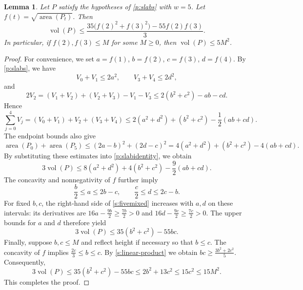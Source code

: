\documentclass[reqno, 11pt]{article}
\numberwithin{equation}{section}
\newtheorem{lemma}[lemma]{Lemma}
\theoremstyle{definition}
\DeclareMathOperator{\vol}{vol}
\DeclareMathOperator{\area}{area}
\numberwithin{equation}{section}
\begin{document}
\begin{lemma}\label{s:twonodes}
Let $P$ satisfy the hypotheses of \cref{p:slabs} with $w=5$. Let $f(t)=\sqrt{\area(P_t)}$. Then
\[
 \vol(P)\le\frac{35\bigl(f(2)^2+f(3)^2\bigr)-55f(2)f(3)}3.
\]
In particular, if $f(2),f(3)\le M$ for some $M\ge0$, then $\vol(P)\le5M^2$.
\end{lemma}
\begin{proof}
For convenience, we set $a=f(1)$, $b=f(2)$, $c=f(3)$, $d=f(4)$. By \cref{p:slabs}, we have
\[
V_0+V_1\le2a^2,\qquad V_3+V_4\le2d^2,
\]
and
\[
2V_2=(V_1+V_2)+(V_2+V_3)-V_1-V_3
\le2(b^2+c^2)-ab-cd.
\]
Hence
\[
\sum_{j=0}^4V_j
=(V_0+V_1)+V_2+(V_3+V_4)
\le2(a^2+d^2)+(b^2+c^2)-\frac12(ab+cd).
\]
The endpoint bounds also give
\[
\area(P_0)+\area(P_5)
\le(2a-b)^2+(2d-c)^2=4(a^2+d^2)+(b^2+c^2)-4(ab+cd).
\]
By substituting these estimates into \eqref{p:slabidentity}, we obtain
\begin{equation}\label{s:fivemixed}
3\vol(P)\le8(a^2+d^2)+4(b^2+c^2)-\frac92(ab+cd).
\end{equation}
The concavity and nonnegativity of $f$ further imply
\[
 \frac{b}{2}\le a\le2b-c,\qquad \frac{c}{2}\le d\le2c-b.
\]
For fixed $b,c$, the right-hand side of \eqref{s:fivemixed}
increases with $a,d$ on these intervals: its derivatives are
$16a-\frac{9b}{2}\ge\frac{7b}{2}>0$ and $16d-\frac{9c}{2}\ge\frac{7c}{2}>0$.
The upper bounds for $a$ and $d$ therefore yield
\[
3\vol(P)\le35(b^2+c^2)-55bc.
\]
Finally, suppose $b,c\le M$ and reflect height if necessary so that
$b\le c$. The concavity of $f$ implies $\frac{2c}{3}\le b\le c$. By
\eqref{s:linear-product} we obtain $bc\ge\frac{3b^2+2c^2}{5}$.
Consequently,
\[
3\vol(P)\le35(b^2+c^2)-55bc
\le2b^2+13c^2\le15c^2\le15M^2.
\]
This completes the proof.
\end{proof}
\end{document}
